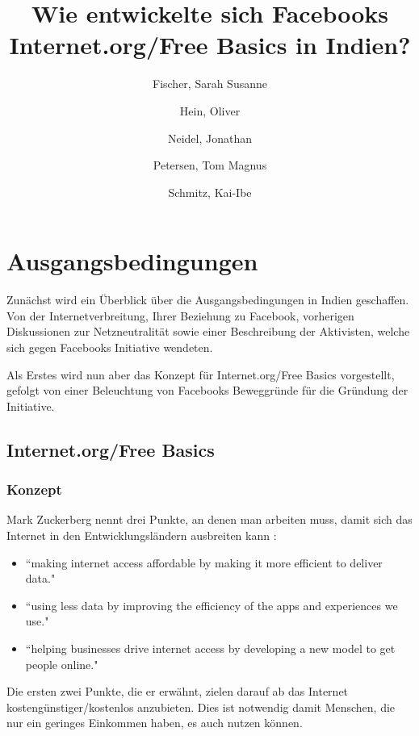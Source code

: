\documentclass{article}
\title{Wie entwickelte sich Facebooks Internet.org/Free Basics in Indien?}
\author{
  Fischer, Sarah Susanne\\
  \and
  Hein, Oliver\\
  \and
  Neidel, Jonathan\\
  \and
  Petersen, Tom Magnus\\
  \and
  Schmitz, Kai-Ibe\\
}
\begin{document}
\maketitle

\section{Ausgangsbedingungen}

Zunächst wird ein Überblick über die Ausgangsbedingungen in Indien geschaffen. Von der Internetverbreitung, Ihrer Beziehung zu Facebook, vorherigen Diskussionen zur Netzneutralität sowie einer Beschreibung der Aktivisten, welche sich gegen Facebooks Initiative wendeten.

Als Erstes wird nun aber das Konzept für Internet.org/Free Basics vorgestellt, gefolgt von einer Beleuchtung von Facebooks Beweggründe für die Gründung der Initiative.

\subsection{Internet.org/Free Basics}

\subsubsection{Konzept}
        
Mark Zuckerberg nennt drei Punkte, an denen man arbeiten muss, damit sich das Internet in den Entwicklungsländern ausbreiten kann
\parencite{HumanRight}:
\begin{itemize}
\item ``making internet access affordable by making it more efficient to deliver data."

\item ``using less data by improving the efficiency of the apps and experiences we use."

\item ``helping businesses drive internet access by developing a new model to get people online."  
\end{itemize}

Die ersten zwei Punkte, die er erwähnt, zielen darauf ab das Internet kostengünstiger/kostenlos anzubieten. 
Dies ist notwendig damit Menschen, die nur ein geringes Einkommen haben, es auch nutzen können.

\medskip
\end{document}
